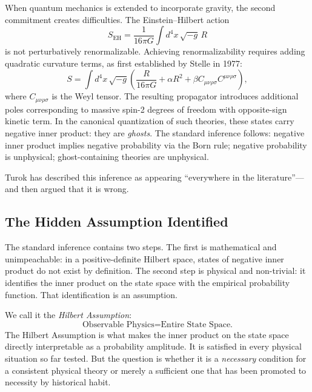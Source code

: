 \documentclass[12pt,a4paper]{article}
\theoremstyle{remark}
\begin{document}
When quantum mechanics is extended to incorporate gravity, the second
commitment creates difficulties. The Einstein--Hilbert action
\begin{equation}
  S_{\mathrm{EH}} = \frac{1}{16\pi G}\int d^4x\,\sqrt{-g}\,R
\end{equation}
is not perturbatively renormalizable. Achieving renormalizability requires
adding quadratic curvature terms, as first established by Stelle in 1977:
\begin{equation}
  S = \int d^4x\,\sqrt{-g}
    \!\left(\frac{R}{16\pi G} + \alpha R^2 + \beta C_{\mu\nu\rho\sigma}C^{\mu\nu\rho\sigma}
    \right),
\end{equation}
where $C_{\mu\nu\rho\sigma}$ is the Weyl tensor. The resulting propagator
introduces additional poles corresponding to massive spin-2 degrees of
freedom with opposite-sign kinetic term. In the canonical quantization of
such theories, these states carry negative inner product: they are
\emph{ghosts}. The standard inference follows: negative inner product
implies negative probability via the Born rule; negative probability is
unphysical; ghost-containing theories are unphysical.

Turok has described this inference as appearing ``everywhere in the
literature''---and then argued that it is wrong.

\subsection{The Hidden Assumption Identified}

The standard inference contains two steps. The first is mathematical and
unimpeachable: in a positive-definite Hilbert space, states of negative
inner product do not exist by definition. The second step is physical and
non-trivial: it identifies the inner product on the state space with the
empirical probability function. That identification is an assumption.

We call it the \emph{Hilbert Assumption}:
\begin{equation}
  \text{Observable Physics} = \text{Entire State Space.}
\end{equation}
The Hilbert Assumption is what makes the inner product on the state space
directly interpretable as a probability amplitude. It is satisfied in
every physical situation so far tested. But the question is whether it is
a \emph{necessary} condition for a consistent physical theory or merely
a sufficient one that has been promoted to necessity by historical habit.
\end{document}
